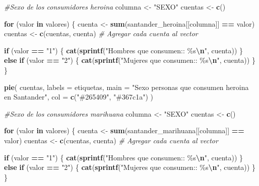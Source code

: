 \documentclass[
]{article}
\newenvironment{Shaded}{\begin{snugshade}}{\end{snugshade}}
\newcommand{\AttributeTok}[1]{\textcolor[rgb]{0.13,0.29,0.53}{#1}}
\newcommand{\CommentTok}[1]{\textcolor[rgb]{0.56,0.35,0.01}{\textit{#1}}}
\newcommand{\ControlFlowTok}[1]{\textcolor[rgb]{0.13,0.29,0.53}{\textbf{#1}}}
\newcommand{\FunctionTok}[1]{\textcolor[rgb]{0.13,0.29,0.53}{\textbf{#1}}}
\newcommand{\NormalTok}[1]{#1}
\newcommand{\OtherTok}[1]{\textcolor[rgb]{0.56,0.35,0.01}{#1}}
\newcommand{\SpecialCharTok}[1]{\textcolor[rgb]{0.81,0.36,0.00}{\textbf{#1}}}
\newcommand{\StringTok}[1]{\textcolor[rgb]{0.31,0.60,0.02}{#1}}
\begin{document}
\begin{Shaded}
\begin{Highlighting}[]
\CommentTok{\#Sexo de los consumidores heroina }
\NormalTok{columna }\OtherTok{\textless{}{-}} \StringTok{"SEXO"}
\NormalTok{cuentas }\OtherTok{\textless{}{-}} \FunctionTok{c}\NormalTok{()}

\ControlFlowTok{for}\NormalTok{ (valor }\ControlFlowTok{in}\NormalTok{ valores) \{}
\NormalTok{  cuenta }\OtherTok{\textless{}{-}} \FunctionTok{sum}\NormalTok{(santander\_heroina[[columna]] }\SpecialCharTok{==}\NormalTok{ valor)}
\NormalTok{  cuentas }\OtherTok{\textless{}{-}} \FunctionTok{c}\NormalTok{(cuentas, cuenta)  }\CommentTok{\# Agregar cada cuenta al vector}
  
  \ControlFlowTok{if}\NormalTok{ (valor }\SpecialCharTok{==} \StringTok{"1"}\NormalTok{) \{}
    \FunctionTok{cat}\NormalTok{(}\FunctionTok{sprintf}\NormalTok{(}\StringTok{"Hombres que consumen:: \%s}\SpecialCharTok{\textbackslash{}n}\StringTok{"}\NormalTok{, cuenta))}
\NormalTok{  \} }\ControlFlowTok{else} \ControlFlowTok{if}\NormalTok{ (valor }\SpecialCharTok{==} \StringTok{"2"}\NormalTok{) \{}
    \FunctionTok{cat}\NormalTok{(}\FunctionTok{sprintf}\NormalTok{(}\StringTok{"Mujeres que consumen:: \%s}\SpecialCharTok{\textbackslash{}n}\StringTok{"}\NormalTok{, cuenta))}
\NormalTok{  \}}
\NormalTok{\}}

\FunctionTok{pie}\NormalTok{(}
\NormalTok{  cuentas,}
  \AttributeTok{labels =}\NormalTok{ etiquetas,}
  \AttributeTok{main =} \StringTok{"Sexo personas que consumen heroina en Santander"}\NormalTok{,}
  \AttributeTok{col =} \FunctionTok{c}\NormalTok{(}\StringTok{"\#265409"}\NormalTok{, }\StringTok{"\#367c1a"}\NormalTok{)}
\NormalTok{)}


\CommentTok{\#Sexo de los consumidores marihuana }
\NormalTok{columna }\OtherTok{\textless{}{-}} \StringTok{"SEXO"}
\NormalTok{cuentas }\OtherTok{\textless{}{-}} \FunctionTok{c}\NormalTok{()}

\ControlFlowTok{for}\NormalTok{ (valor }\ControlFlowTok{in}\NormalTok{ valores) \{}
\NormalTok{  cuenta }\OtherTok{\textless{}{-}} \FunctionTok{sum}\NormalTok{(santander\_marihuana[[columna]] }\SpecialCharTok{==}\NormalTok{ valor)}
\NormalTok{  cuentas }\OtherTok{\textless{}{-}} \FunctionTok{c}\NormalTok{(cuentas, cuenta)  }\CommentTok{\# Agregar cada cuenta al vector}
  
  \ControlFlowTok{if}\NormalTok{ (valor }\SpecialCharTok{==} \StringTok{"1"}\NormalTok{) \{}
    \FunctionTok{cat}\NormalTok{(}\FunctionTok{sprintf}\NormalTok{(}\StringTok{"Hombres que consumen:: \%s}\SpecialCharTok{\textbackslash{}n}\StringTok{"}\NormalTok{, cuenta))}
\NormalTok{  \} }\ControlFlowTok{else} \ControlFlowTok{if}\NormalTok{ (valor }\SpecialCharTok{==} \StringTok{"2"}\NormalTok{) \{}
    \FunctionTok{cat}\NormalTok{(}\FunctionTok{sprintf}\NormalTok{(}\StringTok{"Mujeres que consumen:: \%s}\SpecialCharTok{\textbackslash{}n}\StringTok{"}\NormalTok{, cuenta))}
\NormalTok{  \}}
\NormalTok{\}}


\end{Highlighting}
\end{Shaded}
\end{document}
